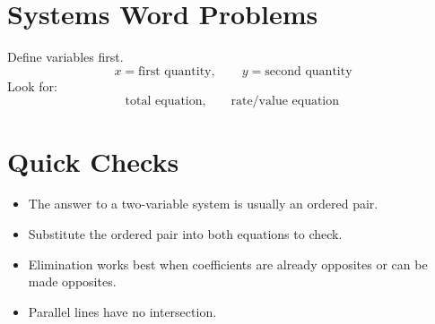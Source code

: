 \documentclass[11pt]{article}
\begin{document}
\section*{Systems Word Problems}
Define variables first.
\[
x=\text{first quantity},\qquad y=\text{second quantity}
\]
Look for:
\[
\text{total equation},\qquad \text{rate/value equation}
\]

\section*{Quick Checks}
\begin{itemize}
  \item The answer to a two-variable system is usually an ordered pair.
  \item Substitute the ordered pair into both equations to check.
  \item Elimination works best when coefficients are already opposites or can be made opposites.
  \item Parallel lines have no intersection.
\end{itemize}
\end{document}
